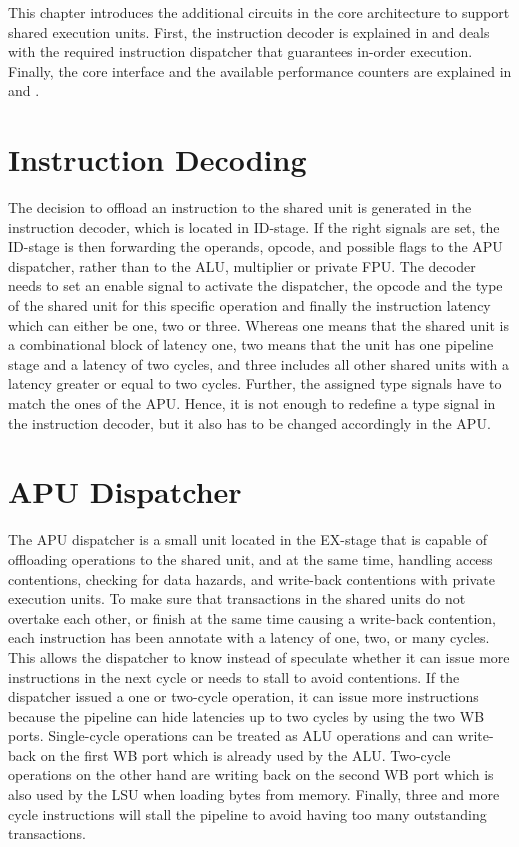 \documentclass[%
 oneside,      %
 openany,      %
 halfparskip,  %
]{scrbook}
\begin{document}
This chapter introduces the additional circuits in the core architecture to support shared execution units. First, the instruction decoder is explained in  and  deals with the required instruction dispatcher that guarantees in-order execution. Finally, the core interface and the available performance counters are explained in  and .

\section{Instruction Decoding}\label{decoder}

The decision to offload an instruction to the shared unit is generated in the instruction decoder, which is located in ID-stage. If the right signals are set, the ID-stage is then forwarding the operands, opcode, and possible flags to the APU dispatcher, rather than to the ALU, multiplier or private FPU. The decoder needs to set an enable signal to activate the dispatcher, the opcode and the type of the shared unit for this specific operation and finally the instruction latency which can either be one, two or three. Whereas one means that the shared unit is a combinational block of latency one, two means that the unit has one pipeline stage and a latency of two cycles, and three includes all other shared units with a latency greater or equal to two cycles.
Further, the assigned type signals have to match the ones of the APU. Hence, it is not enough to redefine a type signal in the instruction decoder, but it also has to be changed accordingly in the APU.

\section{APU Dispatcher}\label{dispatcher}
The APU dispatcher is a small unit located in the EX-stage that is capable of offloading operations to the shared unit, and at the same time, handling access contentions, checking for data hazards, and write-back contentions with private execution units.
To make sure that transactions in the shared units do not overtake each other, or finish at the same time causing a write-back contention, each instruction has been annotate with a latency of one, two, or many cycles. This allows the dispatcher to know instead of speculate whether it can issue more instructions in the next cycle or needs to stall to avoid contentions. If the dispatcher issued a one or two-cycle operation, it can issue more instructions because the pipeline can hide latencies up to two cycles by using the two WB ports. Single-cycle operations can be treated as ALU operations and can write-back on the first WB port which is already used by the ALU. Two-cycle operations on the other hand are writing back on the second WB port which is also used by the LSU when loading bytes from memory. Finally, three and more cycle instructions will stall the pipeline to avoid having too many outstanding transactions.
\end{document}
